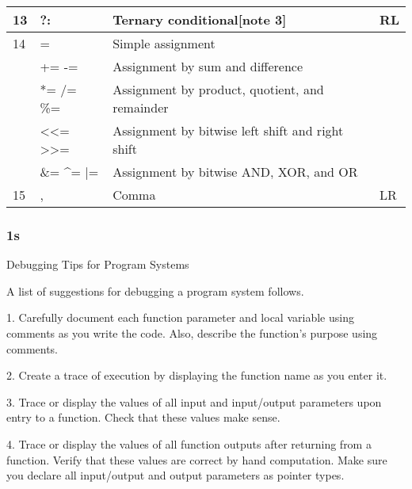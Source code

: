 \documentclass{extarticle}
\begin{document}
\begin{multicols}{2}
\begin{tabular}{|l|l|l|l|}
13             & ?:                                                    & Ternary conditional{[}note 3{]}                                        & RL            \\ \hline
14 & =                                                     & Simple assignment                                                      &               \\
               & += -=                                                 & Assignment by sum and difference                                       &               \\
               & *= /= \%=                                             & Assignment by product, quotient, and remainder                         &               \\
               & \textless{}\textless{}= \textgreater{}\textgreater{}= & Assignment by bitwise left shift and right shift                       &               \\
               & \&= \textasciicircum{}= |=                            & Assignment by bitwise AND, XOR, and OR                                 &               \\ \hline
15             & ,                                                     & Comma                                                                  & LR            \\ \hline
\end{tabular}


\subsubsection{1s}

Debugging Tips for Program Systems

A list of suggestions for debugging a program system follows.

1. Carefully document each function parameter and local variable using comments as you write the code. Also, describe the function’s purpose using comments.

2. Create a trace of execution by displaying the function name as you enter it.

3. Trace or display the values of all input and input/output parameters upon entry to a function. Check that these values make sense.

4. Trace or display the values of all function outputs after returning from a function. Verify that these values are correct by hand computation. Make sure you declare all input/output and output parameters as pointer types.


\end{multicols}
\end{document}
